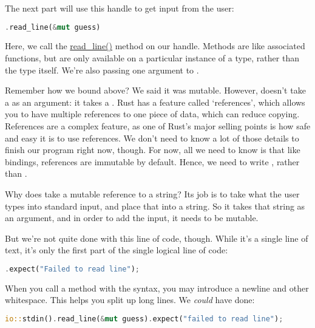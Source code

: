 The next part will use this handle to get input from the user:

\begin{lstlisting}[language=Rust]
.read_line(&mut guess)
\end{lstlisting}

Here, we call the \href{https://doc.rust-lang.org/std/io/struct.Stdin.html\#method.read\_line}{read\_line()} method on our handle.
Methods are like associated functions, but are only available on a particular instance of a type, rather than the type itself. 
We’re also passing one argument to .

\blank

Remember how we bound  above? We said it was mutable. However,  doesn’t take a  as 
an argument: it takes a . Rust has a feature called ‘references’, which allows you to have multiple references 
to one piece of data, which can reduce copying. References are a complex feature, as one of Rust’s major selling points is how 
safe and easy it is to use references. We don’t need to know a lot of those details to finish our program right now, though. 
For now, all we need to know is that like  bindings, references are immutable by default. Hence, we need to write 
, rather than .

\blank

Why does  take a mutable reference to a string? Its job is to take what the user types into standard input, 
and place that into a string. So it takes that string as an argument, and in order to add the input, it needs to be mutable.

\blank

But we’re not quite done with this line of code, though. While it’s a single line of text, it’s only the first part of the 
single logical line of code:

\begin{lstlisting}[language=Rust]
        .expect("Failed to read line");
\end{lstlisting}

When you call a method with the  syntax, you may introduce a newline and other whitespace. This helps you 
split up long lines. We \emph{could} have done:

\begin{lstlisting}[language=Rust]
    io::stdin().read_line(&mut guess).expect("failed to read line");
\end{lstlisting}

